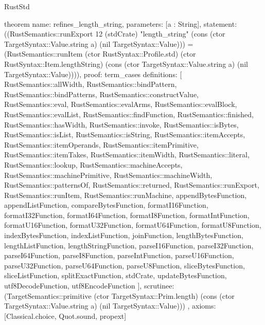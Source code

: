 \begin{lexlean}{RustStd}
\begin{semanticmodule}
theorem{
  name: refines_length_string,
  parameters: [a : String],
  statement: ((RustSemantics::runExport 12 (stdCrate) "length_string" (cons (ctor TargetSyntax::Value.string a) (nil TargetSyntax::Value))) = (RustSemantics::runItem (ctor RustSyntax::Profile.std) (ctor RustSyntax::Item.lengthString) (cons (ctor TargetSyntax::Value.string a) (nil TargetSyntax::Value)))),
  proof: term_cases{
    definitions: [
      RustSemantics::allWidth,
      RustSemantics::bindPattern,
      RustSemantics::bindPatterns,
      RustSemantics::constructValue,
      RustSemantics::eval,
      RustSemantics::evalArms,
      RustSemantics::evalBlock,
      RustSemantics::evalList,
      RustSemantics::findFunction,
      RustSemantics::finished,
      RustSemantics::hasWidth,
      RustSemantics::invoke,
      RustSemantics::isBytes,
      RustSemantics::isList,
      RustSemantics::isString,
      RustSemantics::itemAccepts,
      RustSemantics::itemOperands,
      RustSemantics::itemPrimitive,
      RustSemantics::itemTakes,
      RustSemantics::itemWidth,
      RustSemantics::literal,
      RustSemantics::lookup,
      RustSemantics::machineAccepts,
      RustSemantics::machinePrimitive,
      RustSemantics::machineWidth,
      RustSemantics::patternsOf,
      RustSemantics::returned,
      RustSemantics::runExport,
      RustSemantics::runItem,
      RustSemantics::runMachine,
      appendBytesFunction,
      appendListFunction,
      compareBytesFunction,
      formatI16Function,
      formatI32Function,
      formatI64Function,
      formatI8Function,
      formatIntFunction,
      formatU16Function,
      formatU32Function,
      formatU64Function,
      formatU8Function,
      indexBytesFunction,
      indexListFunction,
      joinFunction,
      lengthBytesFunction,
      lengthListFunction,
      lengthStringFunction,
      parseI16Function,
      parseI32Function,
      parseI64Function,
      parseI8Function,
      parseIntFunction,
      parseU16Function,
      parseU32Function,
      parseU64Function,
      parseU8Function,
      sliceBytesFunction,
      sliceListFunction,
      splitExactFunction,
      stdCrate,
      updateBytesFunction,
      utf8DecodeFunction,
      utf8EncodeFunction
    ],
    scrutinee: (TargetSemantics::primitive (ctor TargetSyntax::Prim.length) (cons (ctor TargetSyntax::Value.string a) (nil TargetSyntax::Value)))
  },
  axioms: [Classical.choice, Quot.sound, propext]
}


\end{semanticmodule}
\end{lexlean}
